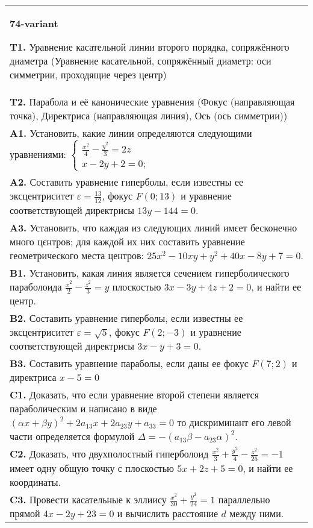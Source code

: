 \documentclass{article}
\begin{document}
\begin{tabular}{m{17cm}}
\textbf{74-variant}
\newline

\textbf{T1.} Уравнение касательной линии второго порядка, сопряжённого диаметра (Уравнение касательной, сопряжённый диаметр: оси симметрии, проходящие через центр) \\
\textbf{T2.} Парабола и её канонические уравнения (Фокус (направляющая точка), Директриса (направляющая линия), Ось (ось симметрии)) \\
\textbf{A1.} Установить, какие линии определяются следующими уравнениями: $\left\{\begin{array}{l}\frac{x^2}{4}-\frac{y^2}{3}=2 z \\ x-2 y+2=0 ;\end{array}\right.$ \\
\textbf{A2.} Составить уравнение гиперболы, если известны ее эксцентриситет $\varepsilon=\frac{13}{12}$, фокус $F(0 ; 13)$ и уравнение соответствующей директрисы $13 y-144=0$. \\
\textbf{A3.} Установить, что каждая из следующих линий имєет бесконечно много цєнтров; для каждой их них составить уравнение геометрического места центров: $25 x^2-10 x y+y^2+40 x-8 y+7=0$. \\
\textbf{B1.} Установить, какая линия является сечением гиперболического параболоида $\frac{x^2}{2}-\frac{z^2}{3}=y$ плоскостью $3 x-3 y+4 z+2=0$, и найти ее центр. \\
\textbf{B2.} Составить уравнение гиперболы, если известны ее эксцентриситет $\varepsilon=\sqrt{5}$, фокус $F(2 ;-3)$ и уравнение соответствующей директрисы $3 x-y+3=0$. \\
\textbf{B3.} Составить уравнение параболы, если даны ее фокус $F(7 ; 2)$ и директриса $x-5=0$ \\
\textbf{C1.} Доказать, что если уравнение второй степени является параболическим и написано в виде $ (\alpha x+\beta y) ^2+2a_{13}x+2a_{23}y+a_{33}=0$ то дискриминант его левой части определяется формулой $\Delta=- (a_{13} \beta-a_{23} \alpha) ^2$. \\
\textbf{C2.} Доказать, что двухполостный гиперболоид $\frac{x^2}{3}+\frac{y^2}{4}-\frac{z^2}{25}=-1$ имеет одну общую точку с плоскостью $5 x+2 z+5=0$, и найти ее координаты. \\
\textbf{C3.} Провести касательные к эллиису $\frac{x^2}{30}+\frac{y^2}{24}=1$ параллельно прямой $4 x-2 y+23=0$ и вычислить расстояние $d$ между ними. \\

\end{tabular}
\vspace{1cm}
\end{document}
